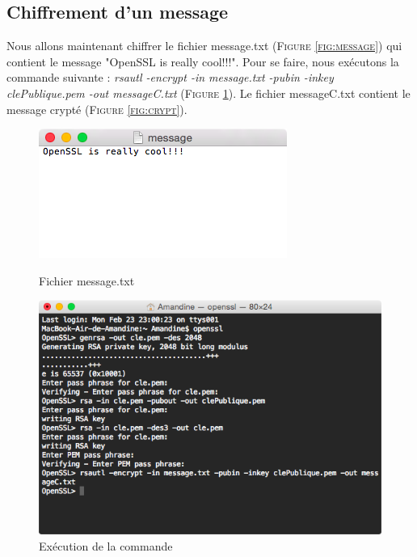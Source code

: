 \documentclass[11pt]{article}
\begin{document}
\subsection{Chiffrement d'un message}
Nous allons maintenant chiffrer le fichier message.txt (\textsc{Figure \ref{fig:message}}) qui contient le message "OpenSSL is really cool!!!". Pour se faire, nous exécutons la commande suivante : \textit{rsautl -encrypt -in message.txt -pubin -inkey clePublique.pem -out messageC.txt} (\textsc{Figure \ref{fig:cde3}}). Le fichier messageC.txt contient le message crypté (\textsc{Figure \ref{fig:crypt}}).
\begin{figure}[hbtp]
    \begin{minipage}[b]{0.4\linewidth}
        \centering \includegraphics[scale=0.4]{Capture/question4.png}
        \caption{Fichier message.txt}
                \label{fig:message}
\label{fig:base}
    \end{minipage}\hfill
    \begin{minipage}[b]{0.48\linewidth}
        \centering \includegraphics[scale=0.4]{Capture/question4b.png}
        \caption{Exécution de la commande}
         \label{fig:cde3}
    \end{minipage}
\end{figure}
\end{document}
